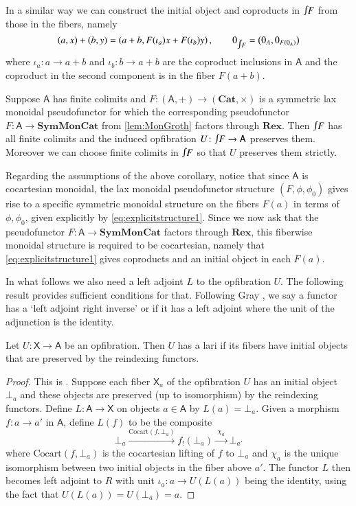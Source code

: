 \documentclass[reqno]{amsart}
\let\maps\colon
\theoremstyle{definition}
\theoremstyle{remark}
\newcommand{\A}{\mathsf{A}}
\newcommand{\X}{\mathsf{X}}
\newcommand{\bicat}{\mathbf}
\newcommand{\Cat}{\bicat{Cat}}
\newcommand{\Rex}{\bicat{Rex}}
\newcommand{\SMC}{\bicat{SymMonCat}}
\newcommand{\define}[1]{{\bf \boldmath{#1}}}
\newcommand{\inta}{\raisebox{.3\depth}{$\smallint\hspace{-.01in}$}}
\begin{document}
In a similar way we can construct the initial object and coproducts in $\inta F$ from those in the fibers, namely
\begin{equation}\label{eq:fibrewisecoprod}
(a,x)+(b,y)=\left(a+ b,F(\iota_a)x+F(\iota_b)y\right), \qquad 
 0_{\inta F}=\left(0_A,0_{F(0_A)}\right)
\end{equation}
where $\iota_a \maps a\to a+b$ and $\iota_b \maps b \to a+b$ are the coproduct inclusions in $\A$ and the coproduct in the second component is in the fiber $F(a+b)$. 
\fi

\begin{cor} \label{cor:fcocMonGroth}
 Suppose $\A$ has finite colimits and $F \maps (\A,+) \to (\Cat,\times)$ is a symmetric lax monoidal pseudofunctor for which the corresponding pseudofunctor $F  \maps \A \to \SMC$ from \cref{lem:MonGroth} factors through $\Rex$.  Then $\inta F$ has all finite colimits and  the induced opfibration $U\maps \inta F \to \A$ preserves them.  Moreover we can choose finite colimits in $\inta F$ so that $U$ preserves them strictly.
\end{cor}

Regarding the assumptions of the above corollary, notice that since $\A$ is cocartesian monoidal, the lax monoidal pseudofunc\-tor structure $(F,\phi,\phi_0)$ gives rise to a specific symmetric monoidal structure on the fibers $F(a)$ in terms of $\phi,\phi_0$, given explicitly by \cref{eq:explicitstructure1}. Since we now ask that the pseudofunctor $F\maps \A\to\SMC$ factors through $\Rex$, this fiberwise monoidal structure is required to be cocartesian, namely that \cref{eq:explicitstructure1} gives coproducts and an initial object in each $F(a)$.

In what follows we also need a left adjoint $L$ to the opfibration $U$.  The following result provides sufficient conditions for that.  Following Gray \cite{Gray}, we say a functor has a `left adjoint right inverse' or \define{lari} if it has a left adjoint where the unit of the adjunction is the identity.

\begin{lem} \label{prop:opfibtolari}
Let $U \maps\X \to \A$ be an opfibration.   Then $U$ has a lari if its fibers have initial objects
that are preserved by the reindexing functors.
\end{lem}

\begin{proof}
 This is \cite[Proposition~4.4]{Gray}.    Suppose each fiber $\X_a$ of the opfibration $U$ has an initial object $\bot_a$ and these objects are preserved (up to isomorphism) by the reindexing functors.   Define $L \maps \A \to \X$ on objects $a \in \A$ by $L(a) = \bot_a$.   Given a morphism $f\maps a\to a'$ in $\A$, define $L(f)$ to be the composite
\[
  \bot_a\xrightarrow{\mathrm{Cocart}(f,\bot_a)}f_!(\bot_a)\xrightarrow{\;\chi_a\;}\bot_{a'}
\]
where $\mathrm{Cocart}(f,\bot_a)$ is the cocartesian lifting of $f$ to $\bot_a$ and $\chi_a$ is the unique isomorphism between two initial objects in the fiber above $a'$.    The functor $L$ then becomes left adjoint to $R$ with unit $\iota_a \maps a \to U(L(a))$ being the identity, using the fact that $U(L(a)) = U(\bot_a) = a$.
\end{proof}
\end{document}
